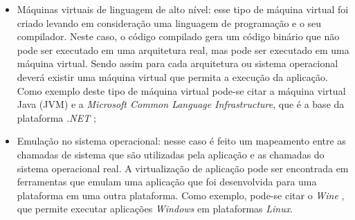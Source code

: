 \begin{itemize}
 \item Máquinas virtuais de linguagem de alto nível: esse tipo de máquina virtual foi criado levando em consideração uma linguagem de 
 programação e o seu compilador. Neste caso, o código compilado gera um código binário que não pode ser executado em uma arquitetura real, 
 mas pode ser executado em uma máquina virtual. Sendo assim para cada arquitetura ou sistema operacional deverá existir uma máquina virtual que
 permita a execução da aplicação. Como exemplo deste tipo de máquina virtual pode-se citar a máquina virtual Java (\ac{JVM})
 e a \textit{Microsoft Common Language Infrastructure}, que é a base da plataforma \textit{.NET} \cite{carissimi2008};
 \item Emulação no sistema operacional: nesse caso é feito um mapeamento entre as chamadas de sistema que são utilizadas pela aplicação 
 e as chamadas do sistema operacional real. A virtualização de aplicação pode ser encontrada em ferramentas que emulam uma aplicação que foi
 desenvolvida para uma plataforma em uma outra plataforma. Como exemplo, pode-se citar o \textit{Wine} \cite{wine}, que permite executar 
 aplicações \textit{Windows} em plataformas \textit{Linux}.
\end{itemize}



